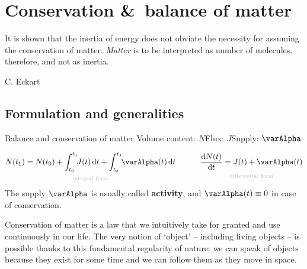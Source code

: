 \documentclass[a4paper,12pt,%
onecolumn,oneside,%
british%
]{memoir}
\newcommand*{\amp}{\&}
\newcommand*{\di}{\mathrm{d}}%
\renewcommand*{\|}[1][]{\nonscript\:#1\vert\nonscript\:\mathopen{}}
\newcommand*{\yti}{t_{0}}
\newcommand*{\ytf}{t_{1}}
\newcommand*{\yN}{N}
\newcommand*{\yJ}{J}
\newcommand*{\ya}{\varAlpha}
\begin{document}
\printpagenotes*
\clearpage
\chapter{Conservation \amp\ balance of matter}
\label{cha:cons_matter}

\epigraph{It is shown that the inertia of energy does not obviate the necessity for assuming the conservation of matter. \emph{Matter} is to be interpreted as number of molecules, therefore, and not as inertia.}{C. Eckart \cites*{eckart1940c}}

\section{Formulation and generalities}
\label{sec:cons_matter_formulation}

\begin{definition}{Balance and conservation of matter}
  Volume content: $\yN$\qquad Flux: $\yJ$\qquad Supply: $\ya$

  \begin{equation}
    \label{eq:cons_matter}
    \underbracket[0pt]{\yN(\ytf) =
      \yN(\yti) +
      \int_{\yti}^{\ytf}\!\!\yJ(t)\,\di t  +
      \int_{\yti}^{\ytf}\!\!\ya(t)\,\di t}_{\mathclap{\text{\color{grey}integral form}}}
      \qquad\quad
      \underbracket[0pt]{\frac{\di\yN(t)}{\di t} = \yJ(t) +
        \ya(t)}_{\mathclap{\text{\color{grey}differential form}}}
  \end{equation}
  The supply $\ya$ is usually called \textbf{activity}, and $\ya(t)\equiv 0$ in case of conservation.
\end{definition}

Conservation of matter is a law that we intuitively take for granted and use continuously in our life. The very notion of \enquote*{object} -- including living objects -- is possible thanks to this fundamental regularity of nature: we can speak of objects because they exist for some time and we can follow them as they move in space. %
\end{document}
